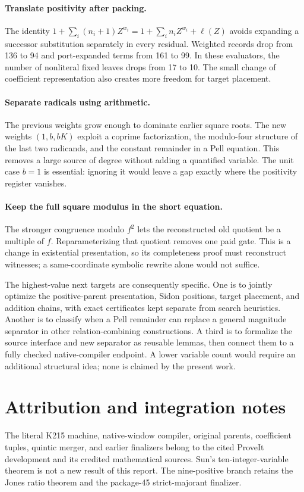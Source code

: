 \documentclass[11pt,letterpaper]{article}
\theoremstyle{remark}\newtheorem{remark}[theorem]{Remark}
\begin{document}
\paragraph{Translate positivity after packing.}
The identity
$1+\sum_i(n_i+1)Z^{w_i}=1+\sum_i n_iZ^{w_i}+\ell(Z)$
avoids expanding a successor substitution separately in every residual.
Weighted records drop from 136 to 94 and port-expanded terms from 161
to 99. In these evaluators, the number of nonliteral fixed leaves drops
from 17 to 10. The small change of coefficient representation also
creates more freedom for target placement.

\paragraph{Separate radicals using arithmetic.}
The previous weights grow enough to dominate earlier square roots.
The new weights $(1,b,bK)$ exploit a coprime factorization,
the modulo-four structure of the last two radicands, and the constant
remainder in a Pell equation. This removes a large source of degree
without adding a quantified variable.
The unit case $b=1$ is essential: ignoring it would leave a gap
exactly where the positivity register vanishes.

\paragraph{Keep the full square modulus in the short equation.}
The stronger congruence modulo $f^2$ lets the reconstructed old quotient
be a multiple of $f$. Reparameterizing that quotient removes one paid
gate. This is a change in existential presentation, so its completeness
proof must reconstruct witnesses; a same-coordinate symbolic rewrite
alone would not suffice.

The highest-value next targets are consequently specific.
One is to jointly optimize the positive-parent presentation, Sidon
positions, target placement, and addition chains, with exact certificates
kept separate from search heuristics.
Another is to classify when a Pell remainder can replace a general
magnitude separator in other relation-combining constructions.
A third is to formalize the source interface and new separator as
reusable lemmas, then connect them to a fully checked native-compiler
endpoint. A lower variable count would require an additional structural
idea; none is claimed by the present work.

\section*{Attribution and integration notes}
The literal K215 machine, native-window compiler, original parents,
coefficient tuples, quintic merger, and earlier finalizers belong to the
cited ProveIt development and its credited mathematical sources.
Sun's ten-integer-variable theorem is not a new result of this report.
The nine-positive branch retains the Jones ratio theorem and the
package-45 strict-majorant finalizer.
\end{document}
